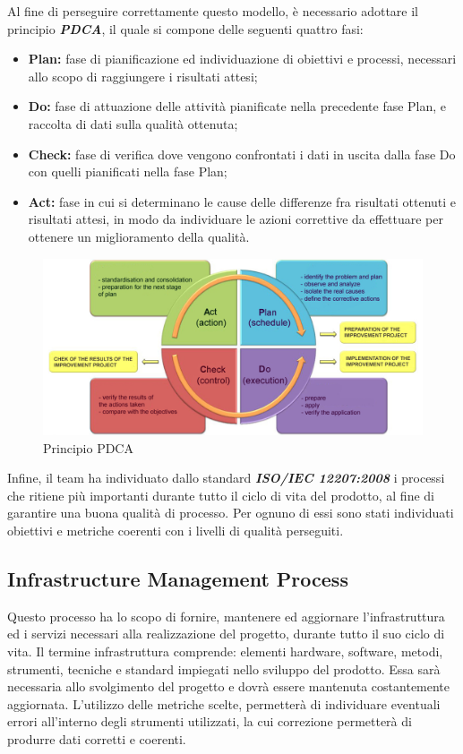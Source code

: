 	Al fine di perseguire correttamente questo modello, è necessario adottare il principio \textbf{\textit{PDCA}}, il quale si compone delle seguenti quattro fasi:
	
	\begin{itemize}
		\item \textbf{Plan:} fase di pianificazione ed individuazione di obiettivi e processi, necessari allo scopo di raggiungere i risultati attesi;
		\item \textbf{Do:} fase di attuazione delle attività pianificate nella precedente fase Plan, e raccolta di dati sulla qualità ottenuta;
		\item \textbf{Check:} fase di verifica dove vengono confrontati i dati in uscita dalla fase Do con quelli pianificati nella fase Plan;
		\item \textbf{Act:} fase in cui si determinano le cause delle differenze fra risultati ottenuti e risultati attesi, in modo da individuare le azioni correttive da effettuare per ottenere un miglioramento della qualità.
	\end{itemize}

	\begin{figure}[H]
		\centering
		\includegraphics[scale=0.6]{includes/img/pdca.png}
		\caption{Principio PDCA}
	\end{figure}

	Infine, il team ha individuato dallo standard \textbf{\textit{ISO/IEC 12207:2008}} i processi che ritiene più importanti durante tutto il ciclo di vita del prodotto, al fine di garantire una buona qualità di processo. Per ognuno di essi sono stati individuati obiettivi e metriche coerenti con i livelli di qualità perseguiti.
	
	\subsection{Infrastructure Management Process}
	Questo processo ha lo scopo di fornire, mantenere ed aggiornare l’infrastruttura ed i servizi necessari alla realizzazione del progetto, durante tutto il suo ciclo di vita. Il termine infrastruttura comprende: elementi hardware, software, metodi, strumenti, tecniche e standard impiegati nello sviluppo del prodotto.
	Essa sarà necessaria allo svolgimento del progetto e dovrà essere mantenuta costantemente aggiornata.
	L'utilizzo delle metriche scelte, permetterà di individuare eventuali errori all’interno degli strumenti utilizzati, la cui correzione permetterà di produrre dati corretti e coerenti.
		
